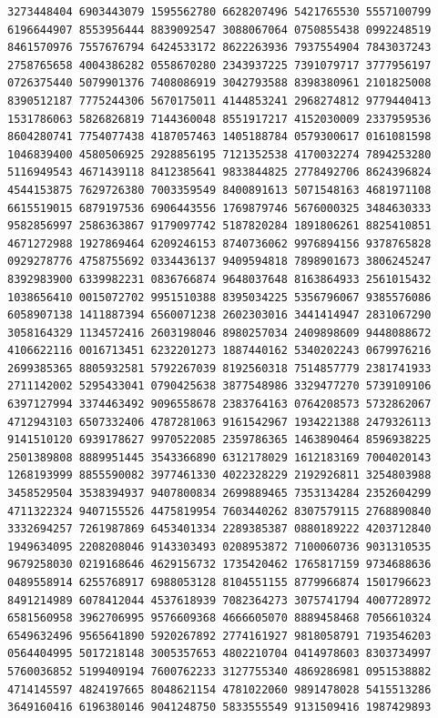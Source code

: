 \begin{Verbatim}[fontsize=\fontsize{6.4}{7.3}\selectfont]
3273448404 6903443079 1595562780 6628207496 5421765530 5557100799 6196644907 8553956444 8839092547 3088067064 0750855438 0992248519
8461570976 7557676794 6424533172 8622263936 7937554904 7843037243 2758765658 4004386282 0558670280 2343937225 7391079717 3777956197
0726375440 5079901376 7408086919 3042793588 8398380961 2101825008 8390512187 7775244306 5670175011 4144853241 2968274812 9779440413
1531786063 5826826819 7144360048 8551917217 4152030009 2337959536 8604280741 7754077438 4187057463 1405188784 0579300617 0161081598
1046839400 4580506925 2928856195 7121352538 4170032274 7894253280 5116949543 4671439118 8412385641 9833844825 2778492706 8624396824
4544153875 7629726380 7003359549 8400891613 5071548163 4681971108 6615519015 6879197536 6906443556 1769879746 5676000325 3484630333
9582856997 2586363867 9179097742 5187820284 1891806261 8825410851 4671272988 1927869464 6209246153 8740736062 9976894156 9378765828
0929278776 4758755692 0334436137 9409594818 7898901673 3806245247 8392983900 6339982231 0836766874 9648037648 8163864933 2561015432
1038656410 0015072702 9951510388 8395034225 5356796067 9385576086 6058907138 1411887394 6560071238 2602303016 3441414947 2831067290
3058164329 1134572416 2603198046 8980257034 2409898609 9448088672 4106622116 0016713451 6232201273 1887440162 5340202243 0679976216
2699385365 8805932581 5792267039 8192560318 7514857779 2381741933 2711142002 5295433041 0790425638 3877548986 3329477270 5739109106
6397127994 3374463492 9096558678 2383764163 0764208573 5732862067 4712943103 6507332406 4787281063 9161542967 1934221388 2479326113
9141510120 6939178627 9970522085 2359786365 1463890464 8596938225 2501389808 8889951445 3543366890 6312178029 1612183169 7004020143
1268193999 8855590082 3977461330 4022328229 2192926811 3254803988 3458529504 3538394937 9407800834 2699889465 7353134284 2352604299
4711322324 9407155526 4475819954 7603440262 8307579115 2768890840 3332694257 7261987869 6453401334 2289385387 0880189222 4203712840
1949634095 2208208046 9143303493 0208953872 7100060736 9031310535 9679258030 0219168646 4629156732 1735420462 1765817159 9734688636
0489558914 6255768917 6988053128 8104551155 8779966874 1501796623 8491214989 6078412044 4537618939 7082364273 3075741794 4007728972
6581560958 3962706995 9576609368 4666605070 8889458468 7056610324 6549632496 9565641890 5920267892 2774161927 9818058791 7193546203
0564404995 5017218148 3005357653 4802210704 0414978603 8303734997 5760036852 5199409194 7600762233 3127755340 4869286981 0951538882
4714145597 4824197665 8048621154 4781022060 9891478028 5415513286 3649160416 6196380146 9041248750 5833555549 9131509416 1987429893

\end{Verbatim}
